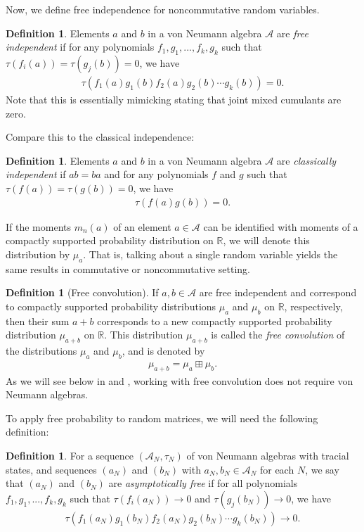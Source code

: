 \documentclass[letterpaper,11pt,oneside,reqno]{amsart}
\numberwithin{equation}{section}
\theoremstyle{definition}
\newtheorem{definition}[proposition]{Definition}
\begin{document}
Now, we define free independence for noncommutative random variables. 
\begin{definition}
Elements $a$ and $b$ in a von Neumann algebra $\mathcal{A}$ are \emph{free independent} if for any polynomials $f_1,g_1,..., f_k, g_k$ such that $\tau(f_i(a))=\tau(g_j(b))=0$, we have 
\begin{align*}
    \tau(f_1(a)g_1(b)f_2(a)g_2(b)\cdots g_k(b))=0.
\end{align*}
Note that this is essentially mimicking  
stating that joint mixed cumulants are zero. 
\end{definition}
Compare this to the classical independence:
\begin{definition}
Elements $a$ and $b$ in a von Neumann algebra $\mathcal{A}$ are \emph{classically independent} if $ab=ba$ and for any polynomials $f$ and $g$ such that $\tau(f(a))=\tau(g(b))=0$, we have 
\begin{align*}
    \tau(f(a)g(b))=0.
\end{align*}
\end{definition}
If the moments $m_n(a)$ of an element $a\in\mathcal{A}$
can be identified with moments of a compactly supported probability distribution on $\mathbb{R}$,
we will denote this distribution by $\mu_a$.
That is, talking about a single random variable yields the same results
in commutative or noncommutative setting.
\begin{definition}[Free convolution]\label{def:free_convolution}
	If $a,b\in\mathcal{A}$ are free independent and correspond to compactly
	supported probability distributions $\mu_a$ and $\mu_b$ on $\mathbb{R}$, respectively,
	then their sum $a+b$ corresponds to a new 
	compactly
	supported probability distribution $\mu_{a+b}$ on $\mathbb{R}$. 
	This distribution $\mu_{a+b}$ is called the \emph{free convolution}
	of the distributions $\mu_a$ and $\mu_b$, and is denoted by 
	\begin{align*}
		\mu_{a+b}=\mu_a\boxplus\mu_b.
	\end{align*}
	As we will see below in 
	and , working with free convolution 
	does not require von Neumann algebras.
\end{definition}


To apply free probability to random matrices, we will need the following definition:
\begin{definition}
For a sequence $(\mathcal{A}_N,\tau_N)$ of von Neumann algebras with tracial states, and sequences $(a_N)$ and $(b_N)$ with $a_N, b_N\in \mathcal{A}_N$ 
for each $N$, we say that $(a_N)$ and $(b_N)$ are \emph{asymptotically free} if 
for all polynomials $f_1,g_1,..., f_k, g_k$ such that $\tau(f_i(a_N))\to 0$ and $\tau(g_j(b_N))\to0$, we have 
\begin{align*}
    \tau(f_1(a_N)g_1(b_N)f_2(a_N)g_2(b_N)\cdots g_k(b_N))\to 0.
\end{align*}
\end{definition}
\end{document}
